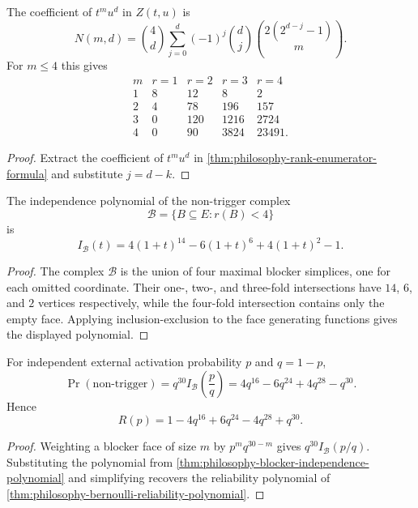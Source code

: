 \begin{corollary}
\label{cor:philosophy-fixed-size-rank-counts}
The coefficient of $t^{m}u^{d}$ in $Z(t,u)$ is
$$
  N(m,d)
  =
  \binom{4}{d}
  \sum_{j=0}^{d}
  (-1)^{j}
  \binom{d}{j}
  \binom{2(2^{d-j}-1)}{m}.
$$
For $m\leq 4$ this gives
$$
\begin{array}{c|rrrr}
  m & r=1 & r=2 & r=3 & r=4\\
  \hline
  1 & 8 & 12 & 8 & 2\\
  2 & 4 & 78 & 196 & 157\\
  3 & 0 & 120 & 1216 & 2724\\
  4 & 0 & 90 & 3824 & 23491.
\end{array}
$$
\end{corollary}
\begin{proof}
Extract the coefficient of $t^{m}u^{d}$ in
\autoref{thm:philosophy-rank-enumerator-formula} and substitute
$j=d-k$.
\end{proof}

\begin{theorem}
\label{thm:philosophy-blocker-independence-polynomial}
The independence polynomial of the non-trigger complex
$$
  \mathcal{B}=\{B\subseteq E:r(B)<4\}
$$
is
$$
  I_{\mathcal{B}}(t)
  =
  4(1+t)^{14}
  -
  6(1+t)^{6}
  +
  4(1+t)^{2}
  -
  1.
$$
\end{theorem}
\begin{proof}
The complex $\mathcal{B}$ is the union of four maximal blocker
simplices, one for each omitted coordinate. Their one-, two-, and
three-fold intersections have $14$, $6$, and $2$ vertices respectively,
while the four-fold intersection contains only the empty face. Applying
inclusion-exclusion to the face generating functions gives the
displayed polynomial.
\end{proof}

\begin{corollary}
\label{cor:philosophy-reliability-from-blocker-independence}
For independent external activation probability $p$ and $q=1-p$,
$$
  \Pr(\text{non-trigger})
  =
  q^{30}I_{\mathcal{B}}\left(\frac{p}{q}\right)
  =
  4q^{16}-6q^{24}+4q^{28}-q^{30}.
$$
Hence
$$
  R(p)=1-4q^{16}+6q^{24}-4q^{28}+q^{30}.
$$
\end{corollary}
\begin{proof}
Weighting a blocker face of size $m$ by $p^{m}q^{30-m}$ gives
$q^{30}I_{\mathcal{B}}(p/q)$. Substituting the polynomial from
\autoref{thm:philosophy-blocker-independence-polynomial} and
simplifying recovers the reliability polynomial of
\autoref{thm:philosophy-bernoulli-reliability-polynomial}.
\end{proof}

